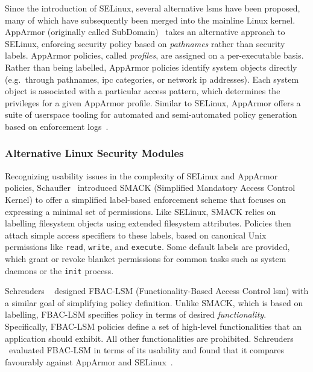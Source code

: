 Since the introduction of SELinux, several alternative \gls{lsm}s have been proposed, many
of which have subsequently been merged into the mainline Linux kernel. AppArmor
(originally called SubDomain)~\cite{cowan2000_apparmor} takes an alternative approach to
SELinux, enforcing security policy based on \textit{pathnames} rather than security
labels.  AppArmor policies, called \textit{profiles}, are assigned on a per-executable
basis. Rather than being labelled, AppArmor policies identify system objects directly
(e.g.\ through pathnames, \gls{ipc} categories, or network \gls{ip} addresses). Each system
object is associated with a particular access pattern, which determines the privileges for
a given AppArmor profile. Similar to SELinux, AppArmor offers a suite of userspace tooling
for automated and semi-automated policy generation based on enforcement
logs~\cite{aa_easyprof, aa_genprof, aa_logprof}.

\subsubsection*{Alternative Linux Security Modules}

Recognizing usability issues in the complexity of SELinux and AppArmor policies,
Schaufler~\cite{schaufler_smack} introduced SMACK (Simplified Mandatory Access Control
Kernel) to offer a simplified label-based enforcement scheme that focuses on expressing
a minimal set of permissions. Like SELinux, SMACK relies on labelling filesystem objects
using extended filesystem attributes. Policies then attach simple access specifiers to
these labels, based on canonical Unix permissions like \texttt{read}, \texttt{write}, and
\texttt{execute}. Some default labels are provided, which grant or revoke blanket
permissions for common tasks such as system daemons or the \texttt{init} process.

Schreuders \etal~\cite{schreuders2012_towards} designed FBAC-LSM (Functionality-Based
Access Control \gls{lsm}) with a similar goal of simplifying policy definition. Unlike
SMACK, which is based on labelling, FBAC-LSM specifies policy in terms of desired
\textit{functionality}. Specifically, FBAC-LSM policies define a set of high-level
functionalities that an application should exhibit. All other functionalities are
prohibited. Schreuders \etal~evaluated FBAC-LSM in terms of its usability and found that
it compares favourably against AppArmor and SELinux~\cite{schreuders2012_towards}.

